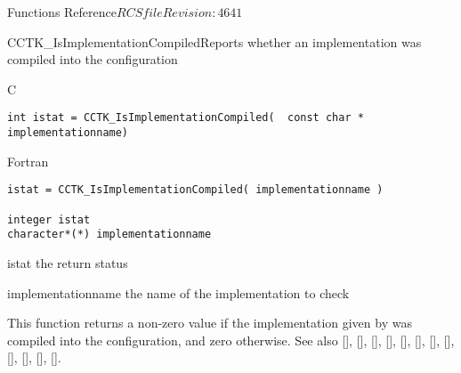 \begin{cactuspart}{ Functions Reference}{$RCSfile$}{$Revision: 4641 $}
\begin{FunctionDescription}{CCTK\_IsImplementationCompiled}{Reports whether an
implementation was compiled into the configuration}
\label{CCTK-IsImplementationCompiled}
\begin{SynopsisSection}
\begin{Synopsis}{C}
\begin{verbatim}int istat = CCTK_IsImplementationCompiled(  const char * implementationname)\end{verbatim}
\end{Synopsis}
\begin{Synopsis}{Fortran}
\begin{verbatim}istat = CCTK_IsImplementationCompiled( implementationname )

integer istat
character*(*) implementationname\end{verbatim}
\end{Synopsis}
\end{SynopsisSection}
\begin{ParameterSection}
\begin{Parameter}{istat}
the return status
\end{Parameter}
\begin{Parameter}{implementationname}
the name of the implementation to check
\end{Parameter}
\end{ParameterSection}
\begin{Discussion}
This function returns a non-zero value if the implementation given by
 was compiled into the configuration, and zero
otherwise.
See also
 [\pageref{CCTK-ActivatingThorn}],
 [\pageref{CCTK-CompiledImplementation}],
 [\pageref{CCTK-CompiledThorn}],
 [\pageref{CCTK-ImplementationRequires}],
 [\pageref{CCTK-ImplementationThorn}],
 [\pageref{CCTK-ImpThornList}],
 [\pageref{CCTK-IsImplementationActive}],
 [\pageref{CCTK-IsThornActive}],
 [\pageref{CCTK-IsThornCompiled}],
 [\pageref{CCTK-NumCompiledImplementations}],
 [\pageref{CCTK-NumCompiledThorns}],
 [\pageref{CCTK-ThornImplementation}].
\end{Discussion}
\end{FunctionDescription}


\end{cactuspart}
